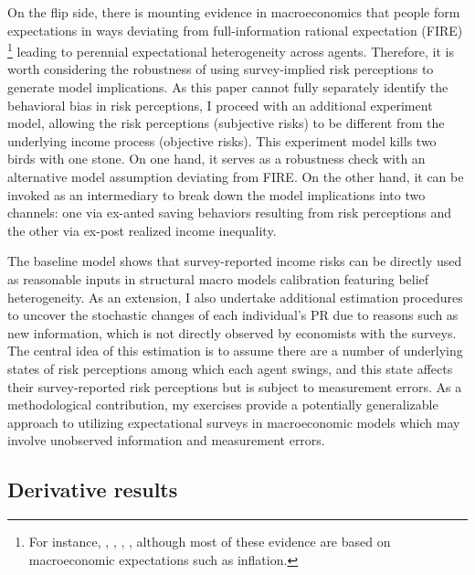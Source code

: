 On the flip side, there is mounting evidence in macroeconomics that people form expectations in ways deviating from full-information rational expectation (FIRE) \footnote{For instance, \cite{mankiw2003disagreement}, \cite{reis2006inattentive}, \cite{coibion2012can}, \cite{wang2021infvar}, although most of these evidence are based on macroeconomic expectations such as inflation.} leading to perennial expectational heterogeneity across agents. Therefore, it is worth considering the robustness of using survey-implied risk perceptions to generate model implications. As this paper cannot fully separately identify the behavioral bias in risk perceptions, I proceed with an additional experiment model, allowing the risk perceptions (subjective risks) to be different from the underlying income process (objective risks). This experiment model kills two birds with one stone. On one hand, it serves as a robustness check with an alternative model assumption deviating from FIRE. On the other hand, it can be invoked as an intermediary to break down the model implications into two channels: one via ex-anted saving behaviors resulting from risk perceptions and the other via ex-post realized income inequality. 

The baseline model shows that survey-reported income risks can be directly used as reasonable inputs in structural macro models calibration featuring belief heterogeneity. As an extension, I also undertake additional estimation procedures to uncover the stochastic changes of each individual's PR due to reasons such as new information, which is not directly observed by economists with the surveys. The central idea of this estimation is to assume there are a number of underlying states of risk perceptions among which each agent swings,  and this state affects their survey-reported risk perceptions but is subject to measurement errors. As a methodological contribution, my exercises provide a potentially generalizable approach to utilizing expectational surveys in macroeconomic models which may involve unobserved information and measurement errors. 

\subsection{Derivative results}

